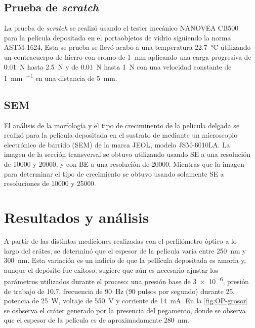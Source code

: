 \documentclass[12pt]{IEEEtran}
\begin{document}
\subsection{Prueba de \emph{scratch}}

La prueba de \emph{scratch} se realizó usando el tester mecánico NANOVEA CB500 para la película depositada en el portaobjetos de vidrio siguiendo la norma ASTM-1624\cite{internationalStandardTestMethod}, Esta se prueba se llevó acabo a una temperatura \qty{22.7}{\degreeCelsius} utilizando un contracuerpo de hierro con cromo de \qty{1}{\mm} aplicando una carga progresiva de \qty{0.01}{\N} hasta \qty{2.5}{\N} y de \qty{0.01}{\N} hasta \qty{1}{\N} con una velocidad constante de \qty{1}{\mm\per\min} en una distancia de \qty{5}{\mm}.

\subsection{SEM}

El análisis de la morfología y el tipo de creciminento de la película delgada se realizó para la película depositada en el sustrato de  mediante un microscopio electrónico de barrido (SEM) de la marca JEOL, modelo JSM-6010LA. La imagen de la sección transversal se obtuvo utilizando usando SE a una resolución de \num{10000} y \num{20000}, y con BE a una resolución de \num{20000}. Mientras que la imagen para determinar el tipo de crecimiento se obtuvo usando solamente SE a resoluciones de \num{10000} y \num{25000}.

\section{Resultados y análisis}

A partir de las distintas mediciones realizadas con el perfilómetro óptico a lo largo del crátes, se determinó que el espesor de la película varía entre \qty{250}{\nm} y \qty{300}{\nm}. Esta variación es un indicio de que la pellícula depositada es amorfa y, aunque el depósito fue exitoso, sugiere que aún es necesario ajustar los parámetros utilizados durante el proceso: una presión base de \qty{3e-6}{\Torr}, presión de trabajo de \qty{10.7}{\mTorr}, frecuencia de \qty{90}{\Hz} (90 pulsos por segundo) durante \qty{25}{\min}, potencia de \qty{25}{\W}, voltaje de \qty{550}{\V} y corriente de \qty{14}{\mA}. En la \cref{fig:OP-grosor} se osbserva el cráter generado por la presencia del pegamento, donde se observa que el espesor de la película es de aproximadamente \qty{280}{\nm}.
\end{document}
